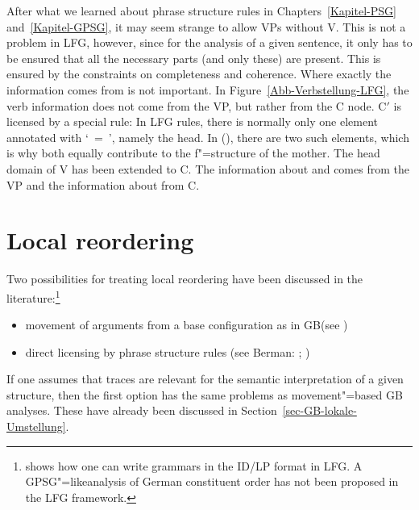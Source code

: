 \noindent
After what we learned about phrase structure rules in Chapters~\ref{Kapitel-PSG} and~\ref{Kapitel-GPSG}, it may seem strange to allow VPs without V. This is not a problem in LFG,
however, since for the analysis of a given sentence, it only has to be ensured that all the necessary parts (and only these) are present. This is ensured by the constraints on 
completeness and coherence. Where exactly the information comes from is not important. In Figure~\ref{Abb-Verbstellung-LFG}, the verb information
does not come from the VP, but rather from the C node.
C$'$ is licensed by a special rule:
\ea
{}
\z
In LFG rules, there is normally only one element annotated with `\up~=~\down', namely the head. In (), there are two such elements, which is why both equally contribute to the
f"=structure of the mother. The head domain of V has been extended to C. The information about \subj and \obj comes from the VP and the information about \pred from C.%

\section{Local reordering}
\label{Abschnitt-LFG-Umstellung}

Two possibilities for treating local reordering have been discussed in the literature:\footnote{%
  \citet[--21]{Kaplan95a} shows how one can write grammars in the ID/LP format in LFG. A GPSG"=like\indexgpsg analysis of German constituent
  order has not been proposed in the LFG framework.%
}
\begin{itemize}
\item movement of arguments from a base configuration as in GB\indexgb (see \citealp{Choi99a-u})
\item direct licensing by phrase structure rules (see Berman: \citeyear[Section~2.1.3.1]{Berman96a-u}; \citeyear{Berman2003a})
\end{itemize}

\noindent
If one assumes that traces are relevant for the semantic interpretation of a given structure, then the first option has the same problems as movement"=based GB analyses.
These have already been discussed in Section~\ref{sec-GB-lokale-Umstellung}.

